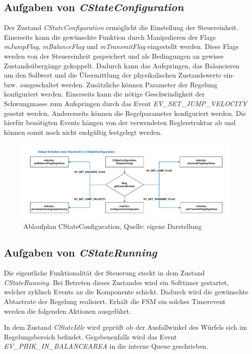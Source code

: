 \documentclass{article}
\begin{document}
\subsection*{Aufgaben von \textit{CStateConfiguration}}
Der Zustand \textit{CStateConfiguration} ermöglicht die Einstellung der Steuereinheit. Einerseits kann die gewünschte Funktion durch Manipulieren der Flags \textit{mJumpFlag}, \textit{mBalanceFlag} und \textit{mTransmitFlag} eingestellt werden. Diese Flags werden von der Steuereinheit gespeichert und als Bedingungen an gewisse Zustandsübergänge gekoppelt. Dadurch kann das Aufspringen, das Balancieren um den Sollwert und die Übermittlung der physikalischen Zustandswerte ein- bzw. ausgeschaltet werden.
Zusätzliche können Parameter der Regelung konfiguriert werden. Einerseits kann die nötige Geschwindigkeit der Schwungmasse zum Aufspringen durch das Event \textit{EV\_SET\_JUMP\_VELOCITY} gesetzt werden. Andererseits können die Regelparameter konfiguriert werden. Die hierfür benötigten Events hängen von der verwendeten Reglerstruktur ab und können somit noch nicht endgültig festgelegt werden.

\begin{figure}[h]
	\includegraphics[width=\linewidth]{PAP_CStateConfiguration}
	\caption{Ablaufplan CStateConfiguration, Quelle: eigene Darstellung}
\end{figure}

\newpage
\subsection*{Aufgaben von \textit{CStateRunning}}
Die eigentliche Funktionalität der Steuerung steckt in dem Zustand \textit{CStateRunning}. Bei Betreten dieses Zustandes wird ein Softtimer gestartet, welcher zyklisch Events an die Komponente schickt. Dadurch wird die gewünschte Abtastrate der Regelung realisiert. Erhält die FSM ein solches Timerevent werden die folgenden Aktionen ausgeführt.

In dem Zustand \textit{CStateIdle} wird geprüft ob der Ausfallwinkel des Würfels sich im Regelungsbereich befindet. Gegebenenfalls wird das Event \textit{EV\_PHIK\_IN\_BALANCEAREA} in die interne Queue geschrieben.
\end{document}
